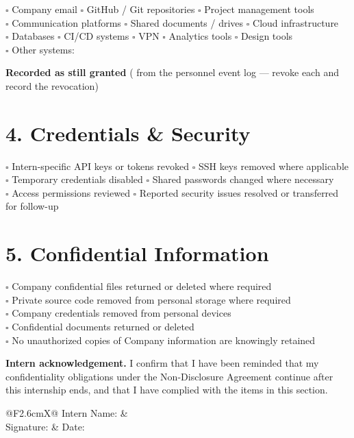 \documentclass{paridyum}
\begin{document}
\vspace{0.3em}
$\square$ Company email \quad $\square$ GitHub / Git repositories \quad
$\square$ Project management tools \\
$\square$ Communication platforms \quad $\square$ Shared documents / drives \quad
$\square$ Cloud infrastructure \\
$\square$ Databases \quad $\square$ CI/CD systems \quad $\square$ VPN \quad
$\square$ Analytics tools \quad $\square$ Design tools \\
$\square$ Other systems: \dkblank[4cm]

\vspace{0.5em}
\begin{softbox}
\textbf{Recorded as still granted} \textnormal{(\dkPAccessOpenCount{} from the
personnel event log --- revoke each and record the revocation)}
\begin{itemize}[leftmargin=*, noitemsep, topsep=2pt]
\dkPAccessOpenItems
\end{itemize}
\end{softbox}

\section*{4. Credentials \& Security}
$\square$ Intern-specific API keys or tokens revoked \quad
$\square$ SSH keys removed where applicable \\
$\square$ Temporary credentials disabled \quad
$\square$ Shared passwords changed where necessary \\
$\square$ Access permissions reviewed \quad
$\square$ Reported security issues resolved or transferred for follow-up

\section*{5. Confidential Information}
$\square$ Company confidential files returned or deleted where required \\
$\square$ Private source code removed from personal storage where required \\
$\square$ Company credentials removed from personal devices \\
$\square$ Confidential documents returned or deleted \\
$\square$ No unauthorized copies of Company information are knowingly retained

\vspace{0.6em}
\begin{softbox}
\textbf{Intern acknowledgement.} I confirm that I have been reminded that my
confidentiality obligations under the Non-Disclosure Agreement continue after this
internship ends, and that I have complied with the items in this section.

\vspace{0.9em}
\begin{tabularx}{\linewidth}{@{}F{2.6cm}X@{}}
Intern Name: &  \\[0.9em]
Signature:   & \dkblank[5.5cm] \quad Date: \dkblank[3.5cm]
\end{tabularx}
\end{softbox}
\end{document}
